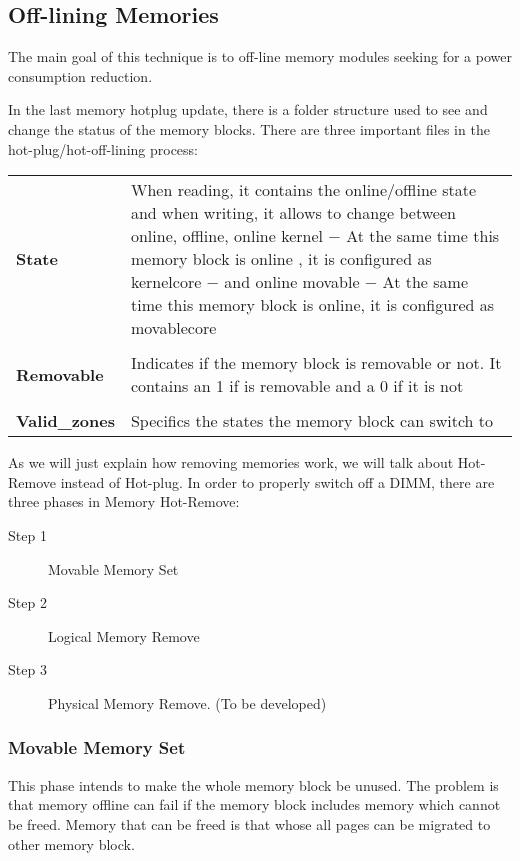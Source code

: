 \subsection{Off-lining Memories}

The main goal of this technique is to off-line memory modules seeking for a power consumption reduction.

In the last memory hotplug update, there is a folder structure used to see and change the status of the memory blocks. There are three important files in the hot-plug/hot-off-lining process:


\begin{tabular}{ p{2.4cm} p{10.5cm}}
  \bf State & When reading, it contains the online/offline state and when writing, it allows to change between online, offline, online kernel $-$ At the same time this memory block is online , it is configured as kernelcore $-$ and online movable $-$ At the same time this memory block is online, it is configured as movablecore \\ \\
  \bf Removable &  Indicates if the memory block is removable or not. It contains an 1 if is removable and a 0 if it is not \\ \\
  \bf Valid\_zones &Specifics the states the memory block can switch to\\
\end{tabular}


As we will just explain how removing memories work, we will talk about Hot-Remove instead of Hot-plug. In order to properly switch off a DIMM, there are three phases in Memory Hot-Remove:

\begin{description}
 \item[Step 1] Movable Memory Set
 \item[Step 2] Logical Memory Remove
 \item[Step 3] Physical Memory Remove. (To be developed)
\end{description}

\subsubsection{Movable Memory Set}

This phase intends to make the whole memory block be unused. The problem is that memory offline can fail if the memory block includes memory which cannot be freed. Memory that can be freed is that whose all pages can be migrated to other memory block.

